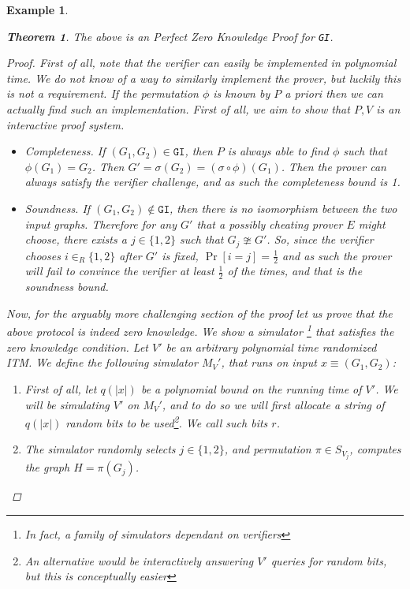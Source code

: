 \documentclass{article}
\newtheorem{theorem}{Theorem}
\newtheorem{example}{Example}
\begin{document}
\begin{example}
    \begin{theorem}
        The above is an Perfect Zero Knowledge Proof for \texttt{GI}.
    \end{theorem}
    \begin{proof}
        First of all, note that the verifier can easily be implemented in polynomial time. We do not know of a way to similarly implement the prover,
        but luckily this is not a requirement. If the permutation $\phi$ is known by $P$ a priori then we can actually find such an implementation.
        First of all, we aim to show that $P, V$ is an interactive proof system.
        \begin{itemize}
            \item Completeness. If $(G_1, G_2) \in \texttt{GI}$, then $P$ is always able to find $\phi$ such that
                  $\phi(G_1) = G_2$. Then $G' = \sigma(G_2) = (\sigma \circ \phi) (G_1)$. Then the prover can always satisfy the verifier challenge,
                  and as such the completeness bound is 1.
            \item Soundness. If $(G_1, G_2) \notin \texttt{GI}$, then there is no isomorphism between the two input graphs. Therefore for any $G'$ that a 
                    possibly cheating prover $E$ might choose, there exists a $j \in \{1, 2\}$ such that $G_j \ncong G'$. So, since the verifier chooses $i \in_R \{1, 2\}$ after $G'$ is fixed, $\Pr[i = j] = \frac{1}{2}$ and as such the prover will fail to convince the verifier 
                    at least $\frac{1}{2}$ of the times, and that is the soundness bound.
        \end{itemize}
        Now, for the arguably more challenging section of the proof let us prove that the above protocol is indeed zero knowledge.
        We show a simulator \footnote{In fact, a family of simulators dependant on verifiers} that satisfies the zero knowledge condition. 
        Let $V'$ be an arbitrary polynomial time randomized ITM. We define the following simulator $M_V'$, that runs on input $x \equiv (G_1, G_2)$:
        \begin{enumerate}
            \item First of all, let $q(|x|)$ be a polynomial bound on the running time of $V'$. We will be simulating $V'$ on $M_V'$, and to do so we will first allocate a string of $q(|x|)$ random bits to be used\footnote{An alternative would be interactively answering $V'$ queries for random bits, but this is conceptually easier}. We call such bits $r$. 
            \item The simulator randomly selects $j \in \{1, 2 \}$, and permutation $\pi \in S_{V_j}$, computes the graph $H = \pi(G_j)$. 

\end{enumerate}
\end{proof}
\end{example}
\end{document}
